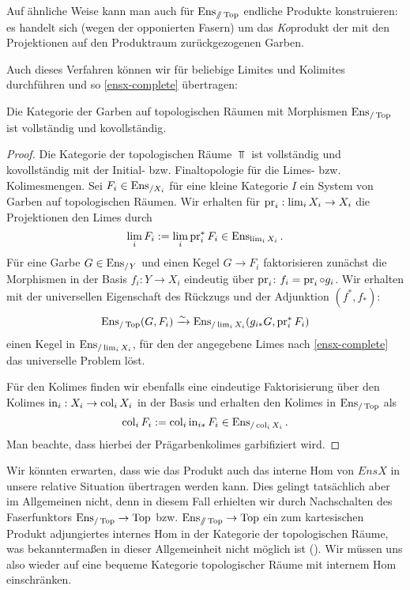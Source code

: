 \begin{bem}
  Auf ähnliche Weise kann man auch für $\operatorname{Ens}_{\mathbin{/\mkern-6mu/} \operatorname{Top}}$ endliche
  Produkte konstruieren: es handelt sich (wegen der opponierten
  Fasern) um das \emph{Ko}produkt der mit den Projektionen auf den
  Produktraum zurückgezogenen Garben.
\end{bem}
Auch dieses Verfahren können wir für beliebige Limites und Kolimites
durchführen und so \ref{ensx-complete} übertragen:
\begin{satz} \label{enstop-complete}
  Die Kategorie der Garben auf topologischen Räumen mit Morphismen
  $\operatorname{Ens}_{/\operatorname{Top}}$ ist vollständig und kovollständig.
\end{satz}
\begin{proof}
  Die Kategorie der topologischen Räume $\Top$ ist vollständig und
  kovollständig mit der Initial- bzw. Finaltopologie für die Limes-
  bzw. Kolimesmengen. Sei $F_i \in \operatorname{Ens}_{/X_i}$ für eine kleine
  Kategorie $I$ ein System von Garben auf topologischen Räumen. Wir
  erhalten für $\operatorname{pr}_i: \lim_i X_i \to X_i$ die Projektionen den Limes
  durch
  \[ \lim_i F_i := \lim_i \operatorname{pr}_i^* F_i \in \operatorname{Ens}_{\lim_i X_i}. \]
  Für eine Garbe $G \in \operatorname{Ens}_{/Y}$ und einen Kegel $G \to F_i$
  faktorisieren zunächst die Morphismen in der Basis $f_i: Y \to X_i$
  eindeutig über $\operatorname{pr}_i$: $f_i = \operatorname{pr}_i \circ g_i$. Wir erhalten mit
  der universellen Eigenschaft des Rückzugs und der Adjunktion $(f^*,
  f_*)$:
  \[ \operatorname{Ens}_{/\operatorname{Top}}(G, F_i) \xrightarrow[]{\sim} \operatorname{Ens}_{/\lim_i X_i}(g_{i*} G, \operatorname{pr}_i^* F_i) \]
  einen Kegel in $\operatorname{Ens}_{/\lim_i X_i}$, für den der angegebene Limes
  nach \ref{ensx-complete} das universelle Problem löst.

  Für den Kolimes finden wir ebenfalls eine eindeutige Faktorisierung
  über den Kolimes $\operatorname{in}_i: X_i \to \operatorname{col}_i X_i$ in der Basis und
  erhalten den Kolimes in $\operatorname{Ens}_{/\operatorname{Top}}$ als
  \[ \operatorname{col}_i F_i := \operatorname{col}_i \operatorname{in}_{i*} F_i \in \operatorname{Ens}_{/\operatorname{col}_i X_i}. \]
  Man beachte, dass hierbei der Prägarbenkolimes garbifiziert wird.
\end{proof}

Wir könnten erwarten, dass wie das Produkt auch das interne Hom von
$EnsX$ in unsere relative Situation übertragen werden kann. Dies
gelingt tatsächlich aber im Allgemeinen nicht, denn in diesem Fall
erhielten wir durch Nachschalten des Faserfunktors $\operatorname{Ens}_{/\operatorname{Top}} \to
\operatorname{Top}$ bzw. $\operatorname{Ens}_{\mathbin{/\mkern-6mu/} \operatorname{Top}} \to \operatorname{Top}$ ein zum kartesischen Produkt
adjungiertes internes Hom in der Kategorie der topologischen Räume,
was bekanntermaßen in dieser Allgemeinheit nicht möglich ist
(\cite{???}). Wir müssen uns also wieder auf eine bequeme Kategorie
topologischer Räume mit internem Hom einschränken.

